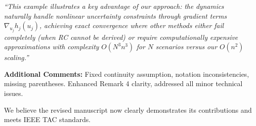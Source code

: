 \documentclass[journal,twoside,web]{ieeecolor}
\begin{document}
\begin{itemize}
{\color{revisionblue}\textit{``This example illustrates a key advantage of our approach: the dynamics naturally handle nonlinear uncertainty constraints through gradient terms $\nabla_{u_j} h_j(u_j)$, achieving exact convergence where other methods either fail completely (when RC cannot be derived) or require computationally expensive approximations with complexity $O(N^3n^3)$ for $N$ scenarios versus our $O(n^2)$ scaling.''}}

\textbf{Additional Comments:} Fixed continuity assumption, notation inconsistencies, missing parentheses. Enhanced Remark 4 clarity, addressed all minor technical issues.

We believe the revised manuscript now clearly demonstrates its contributions and meets IEEE TAC standards.

\end{itemize}
\end{document}
